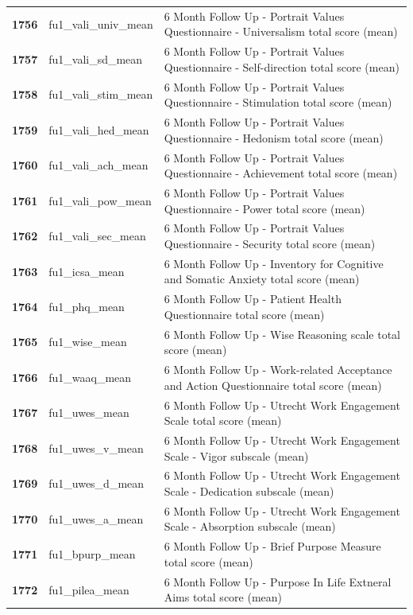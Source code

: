 \documentclass[
  letterpaper,
  DIV=11,
  numbers=noendperiod]{scrartcl}
\begin{document}
\begin{longtable}[t]{>{}cll}
\addlinespace
\textbf{1756} & fu1\_vali\_univ\_mean & 6 Month Follow Up - Portrait Values Questionnaire - Universalism total score (mean)\\
\textbf{1757} & fu1\_vali\_sd\_mean & 6 Month Follow Up - Portrait Values Questionnaire - Self-direction total score (mean)\\
\textbf{1758} & fu1\_vali\_stim\_mean & 6 Month Follow Up - Portrait Values Questionnaire - Stimulation total score (mean)\\
\textbf{1759} & fu1\_vali\_hed\_mean & 6 Month Follow Up - Portrait Values Questionnaire - Hedonism total score (mean)\\
\textbf{1760} & fu1\_vali\_ach\_mean & 6 Month Follow Up - Portrait Values Questionnaire - Achievement total score (mean)\\
\addlinespace
\textbf{1761} & fu1\_vali\_pow\_mean & 6 Month Follow Up - Portrait Values Questionnaire - Power total score (mean)\\
\textbf{1762} & fu1\_vali\_sec\_mean & 6 Month Follow Up - Portrait Values Questionnaire - Security total score (mean)\\
\textbf{1763} & fu1\_icsa\_mean & 6 Month Follow Up - Inventory for Cognitive and Somatic Anxiety total score (mean)\\
\textbf{1764} & fu1\_phq\_mean & 6 Month Follow Up - Patient Health Questionnaire total score (mean)\\
\textbf{1765} & fu1\_wise\_mean & 6 Month Follow Up - Wise Reasoning scale total score (mean)\\
\addlinespace
\textbf{1766} & fu1\_waaq\_mean & 6 Month Follow Up - Work-related Acceptance and Action Questionnaire total score (mean)\\
\textbf{1767} & fu1\_uwes\_mean & 6 Month Follow Up - Utrecht Work Engagement Scale total score (mean)\\
\textbf{1768} & fu1\_uwes\_v\_mean & 6 Month Follow Up - Utrecht Work Engagement Scale - Vigor subscale (mean)\\
\textbf{1769} & fu1\_uwes\_d\_mean & 6 Month Follow Up - Utrecht Work Engagement Scale - Dedication subscale (mean)\\
\textbf{1770} & fu1\_uwes\_a\_mean & 6 Month Follow Up - Utrecht Work Engagement Scale - Absorption subscale (mean)\\
\addlinespace
\textbf{1771} & fu1\_bpurp\_mean & 6 Month Follow Up - Brief Purpose Measure total score (mean)\\
\textbf{1772} & fu1\_pilea\_mean & 6 Month Follow Up - Purpose In Life Extneral Aims total score (mean)\\

\end{longtable}
\end{document}
